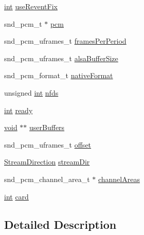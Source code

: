 \begin{DoxyCompactItemize}
\item 
\hyperlink{xmltok_8h_a5a0d4a5641ce434f1d23533f2b2e6653}{int} \hyperlink{struct_pa_alsa_stream_component_a306ed4d1f073e1edad9e3dcc76e38809}{use\+Revent\+Fix}
\item 
snd\+\_\+pcm\+\_\+t $\ast$ \hyperlink{struct_pa_alsa_stream_component_a64644ed14e011db9e821182698acd969}{pcm}
\item 
snd\+\_\+pcm\+\_\+uframes\+\_\+t \hyperlink{struct_pa_alsa_stream_component_adf73ee5aacd35d2068cf7b0316d8cec5}{frames\+Per\+Period}
\item 
snd\+\_\+pcm\+\_\+uframes\+\_\+t \hyperlink{struct_pa_alsa_stream_component_a0334d25b231900ea7d291dd7b7149dbb}{alsa\+Buffer\+Size}
\item 
snd\+\_\+pcm\+\_\+format\+\_\+t \hyperlink{struct_pa_alsa_stream_component_a3cc7e53dfa502ec320c1e870a9c02dd2}{native\+Format}
\item 
unsigned \hyperlink{xmltok_8h_a5a0d4a5641ce434f1d23533f2b2e6653}{int} \hyperlink{struct_pa_alsa_stream_component_a718de0ee2c66d4a7c3185742db0082ba}{nfds}
\item 
\hyperlink{xmltok_8h_a5a0d4a5641ce434f1d23533f2b2e6653}{int} \hyperlink{struct_pa_alsa_stream_component_af0dc1dc7181a8e310995efd0c4f1d44c}{ready}
\item 
\hyperlink{sound_8c_ae35f5844602719cf66324f4de2a658b3}{void} $\ast$$\ast$ \hyperlink{struct_pa_alsa_stream_component_a0c248f3409a0a73fbd641e1be0d71277}{user\+Buffers}
\item 
snd\+\_\+pcm\+\_\+uframes\+\_\+t \hyperlink{struct_pa_alsa_stream_component_ad1b799ae758cf0057dd2df7db47b95a4}{offset}
\item 
\hyperlink{pa__linux__alsa_8c_a72f714624a59d5421dc6b234893a0c64}{Stream\+Direction} \hyperlink{struct_pa_alsa_stream_component_a68200bf1c2218a02b34799956fe337a7}{stream\+Dir}
\item 
snd\+\_\+pcm\+\_\+channel\+\_\+area\+\_\+t $\ast$ \hyperlink{struct_pa_alsa_stream_component_a2d71df829f17e013719fe804a3def576}{channel\+Areas}
\item 
\hyperlink{xmltok_8h_a5a0d4a5641ce434f1d23533f2b2e6653}{int} \hyperlink{struct_pa_alsa_stream_component_aaa548d6dfb327ddcc6f1b2b5d9a9be18}{card}
\end{DoxyCompactItemize}


\subsection{Detailed Description}


